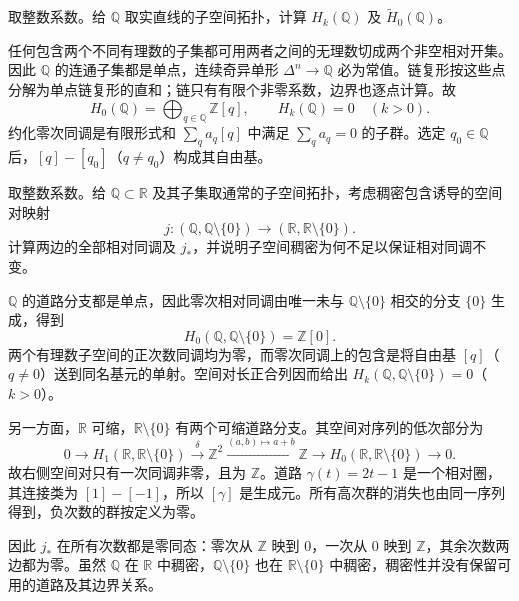 \begin{exercise}\label{g2:ex:rational-singular-homology}
	取整数系数。给 \(\mathbb Q\) 取实直线的子空间拓扑，计算 \(H_k(\mathbb Q)\) 及 \(\widetilde H_0(\mathbb Q)\)。
\end{exercise}
\begin{solution}
	任何包含两个不同有理数的子集都可用两者之间的无理数切成两个非空相对开集。因此 \(\mathbb Q\) 的连通子集都是单点，连续奇异单形 \(\Delta^n\to\mathbb Q\) 必为常值。链复形按这些点分解为单点链复形的直和；链只有有限个非零系数，边界也逐点计算。故
	\[
		H_0(\mathbb Q)=\bigoplus_{q\in\mathbb Q}\mathbb Z[q],\qquad
		H_k(\mathbb Q)=0\quad(k>0).
	\]
	约化零次同调是有限形式和 \(\sum_q a_q[q]\) 中满足 \(\sum_q a_q=0\) 的子群。选定 \(q_0\in\mathbb Q\) 后，\([q]-[q_0]\)（\(q\ne q_0\)）构成其自由基。
\end{solution}

\begin{exercise}\label{g2:ex:relative-zero-components}
	取整数系数。给 \(\mathbb Q\subset\mathbb R\) 及其子集取通常的子空间拓扑，考虑稠密包含诱导的空间对映射
	\[
		j:(\mathbb Q,\mathbb Q\setminus\{0\})
		\longrightarrow(\mathbb R,\mathbb R\setminus\{0\}).
	\]
	计算两边的全部相对同调及 \(j_*\)，并说明子空间稠密为何不足以保证相对同调不变。
\end{exercise}
\begin{solution}
	\(\mathbb Q\) 的道路分支都是单点，因此零次相对同调由唯一未与 \(\mathbb Q\setminus\{0\}\) 相交的分支 \(\{0\}\) 生成，得到
	\[
		H_0(\mathbb Q,\mathbb Q\setminus\{0\})=\mathbb Z[0].
	\]
	两个有理数子空间的正次数同调均为零，而零次同调上的包含是将自由基 \([q]\)（\(q\ne0\)）送到同名基元的单射。空间对长正合列因而给出 \(H_k(\mathbb Q,\mathbb Q\setminus\{0\})=0\)（\(k>0\)）。

	另一方面，\(\mathbb R\) 可缩，\(\mathbb R\setminus\{0\}\) 有两个可缩道路分支。其空间对序列的低次部分为
	\[
		0\longrightarrow H_1(\mathbb R,\mathbb R\setminus\{0\})
		\xrightarrow{\delta}\mathbb Z^2
		\xrightarrow{(a,b)\mapsto a+b}\mathbb Z
		\longrightarrow H_0(\mathbb R,\mathbb R\setminus\{0\})
		\longrightarrow0.
	\]
	故右侧空间对只有一次同调非零，且为 \(\mathbb Z\)。道路 \(\gamma(t)=2t-1\) 是一个相对圈，其连接类为 \([1]-[-1]\)，所以 \([\gamma]\) 是生成元。所有高次群的消失也由同一序列得到，负次数的群按定义为零。

	因此 \(j_*\) 在所有次数都是零同态：零次从 \(\mathbb Z\) 映到 \(0\)，一次从 \(0\) 映到 \(\mathbb Z\)，其余次数两边都为零。虽然 \(\mathbb Q\) 在 \(\mathbb R\) 中稠密，\(\mathbb Q\setminus\{0\}\) 也在 \(\mathbb R\setminus\{0\}\) 中稠密，稠密性并没有保留可用的道路及其边界关系。
\end{solution}

